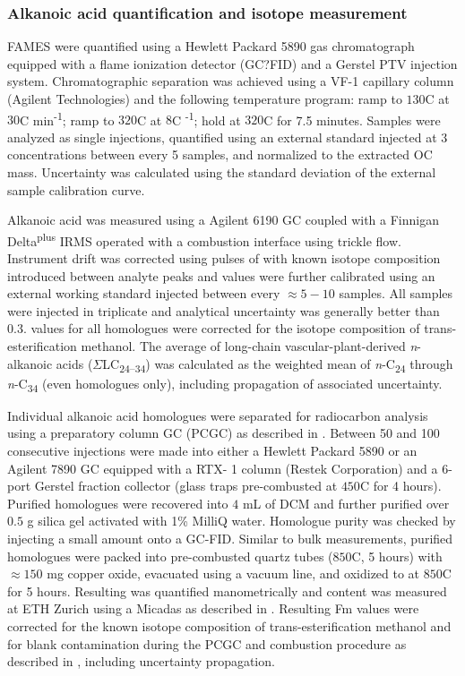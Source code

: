\subsubsection{Alkanoic acid quantification and isotope measurement}

FAMES were quantified using a Hewlett Packard 5890 gas chromatograph equipped with a flame ionization detector (GC?FID) and a Gerstel PTV injection system. Chromatographic separation was achieved using a VF-1 capillary column (Agilent Technologies) and the following temperature program: ramp to $130$\textdegree C at $30$\textdegree C min\textsuperscript{-1}; ramp to $320$\textdegree C at $8$\textdegree C \textsuperscript{-1}; hold at $320$\textdegree C for 7.5 minutes. Samples were analyzed as single injections, quantified using an external standard injected at 3 concentrations between every 5 samples, and normalized to the extracted OC mass. Uncertainty was calculated using the standard deviation of the external sample calibration curve.

Alkanoic acid  was measured using a Agilent 6190 GC coupled with a Finnigan Delta\textsuperscript{plus} IRMS operated with a combustion interface using  trickle flow. Instrument drift was corrected using pulses of  with known isotope composition introduced between analyte peaks and  values were further calibrated using an external working standard injected between every $\approx 5 - 10$ samples. All samples were injected in triplicate and analytical uncertainty was generally better than 0.3\textperthousand.  values for all homologues were corrected for the isotope composition of trans-esterification methanol. The average of long-chain vascular-plant-derived \textit{n}-alkanoic acids ($\Sigma$LC\textsubscript{24--34}) was calculated as the weighted mean of \textit{n}-C\textsubscript{24} through \textit{n}-C\textsubscript{34} (even homologues only), including propagation of associated uncertainty.

Individual alkanoic acid homologues were separated for radiocarbon analysis using a preparatory column GC (PCGC) as described in \citet{Galy:2011hk}. Between 50 and 100 consecutive injections were made into either a Hewlett Packard 5890 or an Agilent 7890 GC equipped with a RTX- 1 column (Restek Corporation) and a 6-port Gerstel fraction collector (glass traps pre-combusted at $450$\textdegree C for 4 hours). Purified homologues were recovered into $4$ mL of DCM and further purified over $0.5$ g silica gel activated with 1\% MilliQ water. Homologue purity was checked by injecting a small amount onto a GC-FID. Similar to bulk measurements, purified homologues were packed into pre-combusted quartz tubes ($850$\textdegree C, 5 hours) with $\approx 150$ mg copper oxide, evacuated using a vacuum line, and oxidized to  at $850$\textdegree C for 5 hours. Resulting  was quantified manometrically and  content was measured at ETH Zurich using a Micadas as described in \citet{Christl:2013ks}. Resulting Fm values were corrected for the known isotope composition of trans-esterification methanol and for blank contamination during the PCGC and combustion procedure as described in \citet{Fornace:2016th}, including uncertainty propagation.


